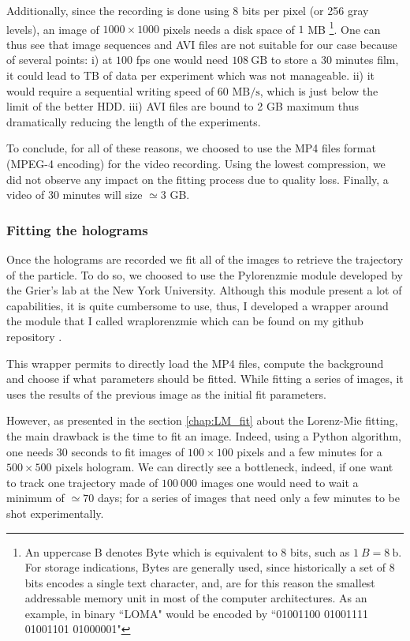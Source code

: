 \newpage

Additionally, since the recording is done using 8 bits per pixel (or 256 gray levels), an image of $1000 \times 1000$ pixels needs a disk space of $1$ MB \footnote{An uppercase B denotes Byte which is equivalent to 8 bits, such as $1\mathrm ~ {B} = 8 ~ \mathrm{b}$. For storage indications, Bytes are generally used, since historically a set of $8$ bits encodes a single text character, and, are for this reason the smallest addressable memory unit in most of the computer architectures. As an example, in binary ``LOMA" would be encoded by ``01001100 01001111 01001101 01000001" }. One can thus see that image sequences and AVI files are not suitable for our case because of several points: i) at $100$ \gls{fps} one would need $108 ~ \mathrm{GB}$ to store a 30 minutes film, it could lead to TB of data per experiment which was not manageable. ii) it would require a sequential writing speed of 60 $\mathrm{MB/s}$, which is just below the limit of the better HDD. iii) AVI files are bound to 2 GB maximum thus dramatically reducing the length of the experiments.

To conclude, for all of these reasons, we choosed to use the MP4 files format (MPEG-4 encoding) for the video recording. Using the lowest compression, we did not observe any impact on the fitting process due to quality loss. Finally, a video of 30 minutes will size $\simeq 3$ GB.


\subsubsection{Fitting the holograms}


Once the holograms are recorded we fit all of the images to retrieve the trajectory of the particle. To do so, we choosed to use the Pylorenzmie module developed by the Grier's lab at the New York University. Although this module present a lot of capabilities, it is quite cumbersome to use, thus, I developed a wrapper around the module that I called wraplorenzmie which can be found on my github repository \href{https://github.com/eXpensia/wraplorenzmie}{\faGithub}. 

This wrapper permits to directly load the MP4 files, compute the background and choose if what parameters should be fitted. While fitting a series of images, it uses the results of the previous image as the initial fit parameters.

However, as presented in the section \ref{chap:LM_fit} about the Lorenz-Mie fitting, the main drawback is the time to fit an image. Indeed, using a Python algorithm, one needs $30$ seconds to fit images of $100 \times  100$ pixels and a few minutes for a $500\times 500$ pixels hologram. We can directly see a bottleneck, indeed, if one want to track one trajectory made of $100~000$ images one would need to wait a minimum of $\simeq 70$ days; for a series of images that need only a few minutes to be shot experimentally. 

